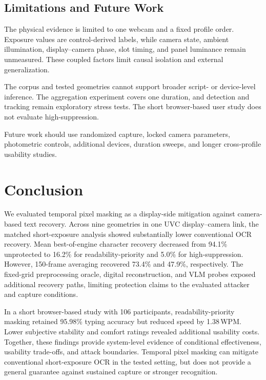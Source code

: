 \documentclass{ieeeaccess}
\begin{document}
\subsection{Limitations and Future Work}

The physical evidence is limited to one webcam and a fixed profile order. Exposure values are control-derived labels, while camera state, ambient illumination, display--camera phase, slot timing, and panel luminance remain unmeasured. These coupled factors limit causal isolation and external generalization.

The corpus and tested geometries cannot support broader script- or device-level inference. The aggregation experiment covers one duration, and detection and tracking remain exploratory stress tests. The short browser-based user study does not evaluate high-suppression.

Future work should use randomized capture, locked camera parameters, photometric controls, additional devices, duration sweeps, and longer cross-profile usability studies.


\section{Conclusion}
\label{sec:conclusion}

We evaluated temporal pixel masking as a display-side mitigation against camera-based text recovery. Across nine geometries in one UVC display--camera link, the matched short-exposure analysis showed substantially lower conventional OCR recovery. Mean best-of-engine character recovery decreased from 94.1\% unprotected to 16.2\% for readability-priority and 5.0\% for high-suppression. However, 150-frame averaging recovered 73.4\% and 47.9\%, respectively. The fixed-grid preprocessing oracle, digital reconstruction, and VLM probes exposed additional recovery paths, limiting protection claims to the evaluated attacker and capture conditions.

In a short browser-based study with 106 participants, readability-priority masking retained 95.98\% typing accuracy but reduced speed by 1.38\,WPM. Lower subjective stability and comfort ratings revealed additional usability costs. Together, these findings provide system-level evidence of conditional effectiveness, usability trade-offs, and attack boundaries. Temporal pixel masking can mitigate conventional short-exposure OCR in the tested setting, but does not provide a general guarantee against sustained capture or stronger recognition.
\end{document}
